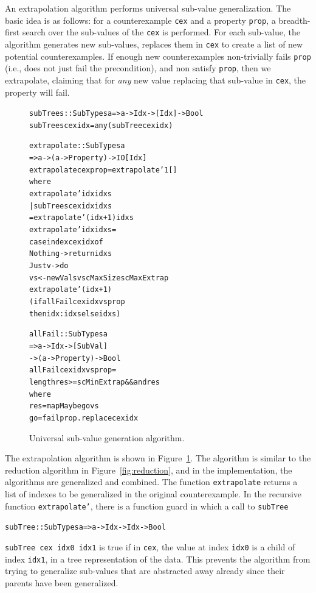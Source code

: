 \documentclass[10pt]{sigplanconf}
\newenvironment{code}{\begin{alltt}}{\end{alltt}}
\newcommand{\ttp}[1]{\texttt{#1}}
\begin{document}
An extrapolation algorithm performs universal sub-value generalization.  The
basic idea is as follows: for a counterexample \ttp{cex} and a property
\ttp{prop}, a breadth-first search over the sub-values of the \ttp{cex} is
performed.  For each sub-value, the algorithm generates new sub-values, replaces
them in \ttp{cex} to create a list of new potential counterexamples.  If enough
new counterexamples non-trivially fails \ttp{prop} (i.e., does not just fail the
precondition), and non satisfy \ttp{prop}, then we extrapolate, claiming that
for \emph{any} new value replacing that sub-value in \ttp{cex}, the property
will fail.

\begin{figure}
  \begin{code}
subTrees :: SubTypes a => a -> Idx -> [Idx] -> Bool
subTrees cex idx = any (subTree cex idx)

extrapolate :: SubTypes a
            => a -> (a -> Property) -> IO [Idx]
extrapolate cex prop = extrapolate' 1 []
  where
  extrapolate' idx idxs
    | subTrees cex idx idxs
    = extrapolate' (idx+1) idxs
  extrapolate' idx idxs =
    case index cex idx of
      Nothing -> return idxs
      Just v  -> do
        vs <- newVals v scMaxSize scMaxExtrap
        extrapolate' (idx+1)
          (if allFail cex idx vs prop
             then idx:idxs else idxs)

allFail :: SubTypes a
        => a -> Idx -> [SubVal]
        -> (a -> Property) -> Bool
allFail cex idx vs prop =
  length res >= scMinExtrap && and res
  where
  res  = mapMaybe go vs
  go   = fail prop . replace cex idx
  \end{code}
  \caption{Universal sub-value generation algorithm.}
  \label{fig:universal}
\end{figure}

The extrapolation algorithm is shown in Figure~\ref{fig:universal}.  The
algorithm is similar to the reduction algorithm in Figure~\ref{fig:reduction},
and in the implementation, the algorithms are generalized and combined.  The
function \ttp{extrapolate} returns a list of indexes to be generalized in the
original counterexample.  In the recursive function \ttp{extrapolate'}, there is
a function guard in which a call to \ttp{subTree}
%
\begin{code}
subTree :: SubTypes a => a -> Idx -> Idx -> Bool
\end{code}
%
\ttp{subTree cex idx0 idx1} is true if in \ttp{cex}, the value at index
\ttp{idx0} is a child of index \ttp{idx1}, in a tree representation of the
data.  This prevents the algorithm from trying to generalize sub-values that are
abstracted away already since their parents have been generalized.
\end{document}
